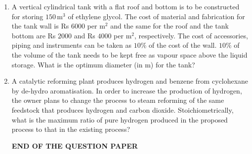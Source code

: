 \documentclass[journal,12pt,onecolumn]{IEEEtran}
\theoremstyle{remark}
\begin{document}
\begin{enumerate}
\item A vertical cylindrical tank with a flat roof and bottom is to be constructed for storing $150 \, \text{m}^3$ of ethylene glycol. The cost of material and fabrication for the tank wall is Rs $6000$ per $\text{m}^2$ and the same for the roof and the tank bottom are Rs $2000$ and Rs $4000$ per $\text{m}^2$, respectively. The cost of accessories, piping and instruments can be taken as $10\%$ of the cost of the wall. $10\%$ of the volume of the tank needs to be kept free as vapour space above the liquid storage. What is the optimum diameter (in m) for the tank?
\hfill{}
\begin{enumerate}
    \end{enumerate}
\item A catalytic reforming plant produces hydrogen and benzene from cyclohexane by de-hydro aromatisation. In order to increase the production of hydrogen, the owner plans to change the process to steam reforming of the same feedstock that produces hydrogen and carbon dioxide. Stoichiometrically, what is the maximum ratio of pure hydrogen produced in the proposed process to that in the existing process?
\hfill{}
\begin{enumerate}
\end{enumerate}
    \centering
\textbf{END OF THE QUESTION PAPER}
\end{enumerate}
\end{document}
